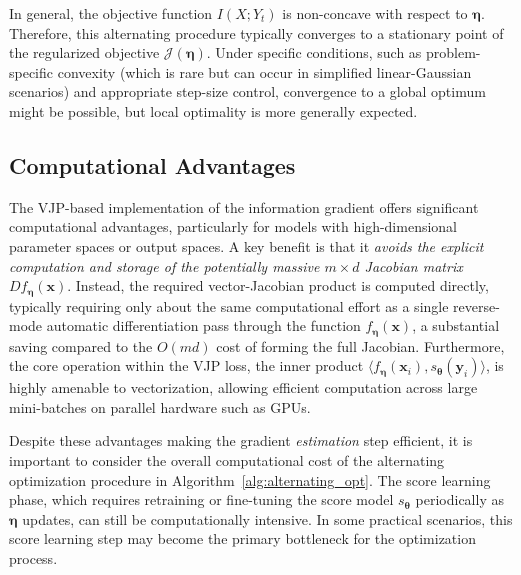 \documentclass[conference]{IEEEtran}
\begin{document}
In general, the objective function $I(X;Y_t)$ is non-concave with respect to 
$\bm \eta$. Therefore, this alternating procedure typically converges to a stationary point 
of the regularized objective $\mathcal{J}(\bm\eta)$. Under specific conditions, 
such as problem-specific convexity (which is rare but can occur in simplified linear-Gaussian scenarios) 
and appropriate step-size control, convergence to a global optimum might be possible, 
but local optimality is more generally expected.


\subsection{Computational Advantages}
\label{subsec:computational_advantages}
The VJP-based implementation of the information gradient offers significant 
computational advantages, particularly for models with high-dimensional parameter 
spaces or output spaces. 
A key benefit is that it {\em avoids the explicit computation and storage of 
the potentially massive $m \times d$ Jacobian matrix} 
$D f_{\bm \eta}(\bm x)$. 
Instead, the required vector-Jacobian product is computed directly, 
typically requiring only about the same computational effort as a single 
reverse-mode automatic differentiation pass 
through the function $f_{\bm \eta}(\bm x)$, 
a substantial saving compared to the $O(md)$ cost of forming the full Jacobian. 
Furthermore, the core operation within the VJP loss, 
the inner product $\langle f_{\bm \eta}(\bm x_i), s_{\bm \theta}(\bm y_i) \rangle$, 
is {highly amenable to vectorization}, allowing efficient computation across 
large mini-batches on parallel hardware such as GPUs.

Despite these advantages making the gradient \emph{estimation} step efficient, 
it is important to consider the overall computational cost of the alternating optimization 
procedure in Algorithm~\ref{alg:alternating_opt}. 
The score learning phase, which requires retraining or fine-tuning the score model 
$s_{\bm \theta}$ periodically as $\bm \eta$ updates, 
can still be computationally intensive. In some practical scenarios, 
this score learning step may become the primary bottleneck 
for the optimization process.
\end{document}
